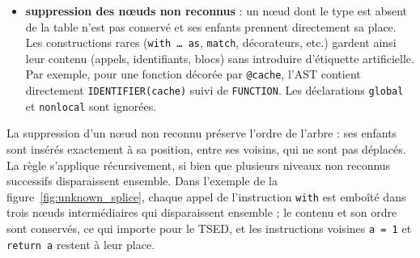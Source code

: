 \documentclass[12pt,a4paper,oneside]{report}
\begin{document}
\begin{itemize}
        un paramètre devient un nœud \texttt{IDENTIFIER}. Le nombre et
        l'ordre des paramètres sont conservés, ce qui suffit à
        l'anonymisation en \texttt{PARAM\_1}, \texttt{PARAM\_2}, etc. ; les
        valeurs par défaut et les annotations de type relèvent du style et
        non de la stratégie ;
  \item \textbf{suppression des nœuds non reconnus} : un nœud dont le type
        est absent de la table n'est pas conservé et ses enfants prennent
        directement sa place. Les constructions rares (\texttt{with \dots\ as},
        \texttt{match}, décorateurs, etc.) gardent ainsi leur contenu
        (appels, identifiants, blocs) sans introduire d'étiquette
        artificielle. Par exemple, pour une fonction décorée par
        \texttt{@cache}, l'AST contient directement
        \texttt{IDENTIFIER(cache)} suivi de \texttt{FUNCTION}. Les
        déclarations \texttt{global} et \texttt{nonlocal} sont ignorées.
\end{itemize}

La suppression d'un nœud non reconnu préserve l'ordre de l'arbre : ses
enfants sont insérés exactement à sa position, entre ses voisins, qui ne
sont pas déplacés. La règle s'applique récursivement, si bien que plusieurs
niveaux non reconnus successifs disparaissent ensemble. Dans l'exemple de la
figure~\ref{fig:unknown_splice}, chaque appel de l'instruction
\texttt{with} est emboîté dans trois nœuds intermédiaires qui disparaissent
ensemble ; le contenu et son ordre sont conservés, ce qui importe pour le
TSED, et les instructions voisines \texttt{a = 1} et \texttt{return a}
restent à leur place.
\end{document}
